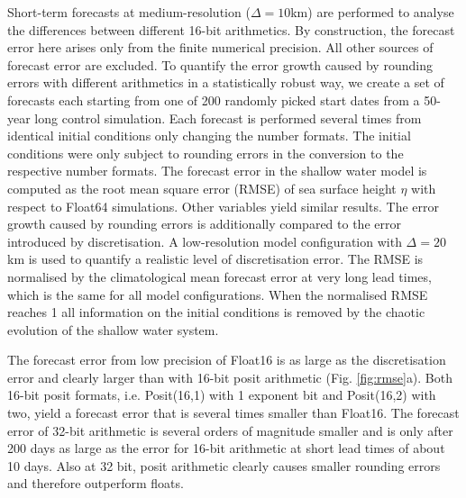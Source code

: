 Short-term forecasts at medium-resolution ($\Delta = 10$km) are performed to analyse the differences between
different 16-bit arithmetics. By construction, the forecast error here arises only from the finite numerical precision. All other
sources of forecast error are excluded. To quantify the error growth caused by rounding errors with different arithmetics in a
statistically robust way, we create a set of forecasts each starting from one of 200 randomly picked start dates from a 50-year
long control simulation. Each forecast is performed several times from identical initial conditions only changing the number formats.
The initial conditions were only subject to rounding errors in the conversion to the respective number formats.
The forecast error in the shallow water model is computed as the root mean square error (RMSE) of sea surface height $\eta$
with respect to Float64 simulations. Other variables yield similar results. The error growth caused by rounding errors is additionally
compared to the error introduced by discretisation. A low-resolution model configuration with $\Delta = 20$km is used to quantify a
realistic level of discretisation error. The RMSE is normalised by the climatological mean forecast error at very long lead times, which
is the same for all model configurations. When the normalised RMSE reaches 1 all information on the initial conditions is removed
by the chaotic evolution of the shallow water system.

The forecast error from low precision of Float16 is as large as the discretisation error and clearly larger than with 16-bit posit
arithmetic (Fig. \ref{fig:rmse}a). Both 16-bit posit formats, i.e. Posit(16,1) with 1 exponent bit and Posit(16,2) with two,
yield a forecast error that is several times smaller than Float16. The forecast error of 32-bit arithmetic is several orders of magnitude
smaller and is only after 200 days as large as the error for 16-bit arithmetic at short lead times of about 10 days. Also at 32 bit,
posit arithmetic clearly causes smaller rounding errors and therefore outperform floats.

